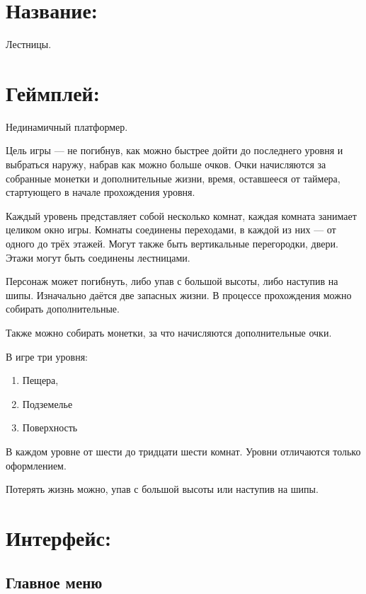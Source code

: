 \documentclass[12pt,a4paper]{article}
\begin{document}
\newcommand{\pics}[3]{
	\begin{figure}[htbp!]
		\noindent 
		\texttt{[image: ./Pics/\#2]}
		\caption{#3}
	\end{figure}
	\FloatBarrier}

\section{Название:} Лестницы.\\

\section{Геймплей:} Нединамичный платформер.

Цель игры --- не погибнув, как можно быстрее дойти до последнего уровня и выбраться наружу, набрав как можно больше очков. Очки начисляются за собранные монетки и дополнительные жизни, время, оставшееся от таймера, стартующего в начале прохождения уровня.

Каждый уровень представляет собой несколько комнат, каждая комната занимает целиком окно игры. Комнаты соединены переходами, в каждой из них --- от одного до трёх этажей. Могут также быть вертикальные перегородки, двери. Этажи могут быть соединены лестницами.

Персонаж может погибнуть, либо упав с большой высоты, либо наступив на шипы. Изначально даётся две запасных жизни. В процессе прохождения можно собирать дополнительные.

Также можно собирать монетки, за что начисляются дополнительные очки.

В игре три уровня:
\begin{enumerate}
\item Пещера,
\item Подземелье
\item Поверхность
\end{enumerate}
В каждом уровне от шести до тридцати шести комнат. Уровни отличаются только оформлением.

Потерять жизнь можно, упав с большой высоты или наступив на шипы.\\

\section{Интерфейс:}
\subsection{Главное меню}
\end{document}
